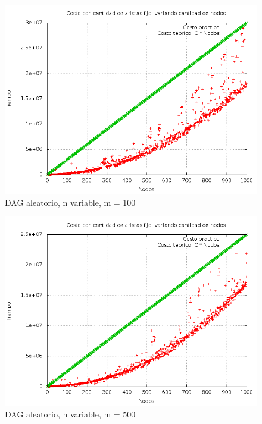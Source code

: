 
%

%
\begin{figure}[H]
	\centering
	\includegraphics[scale=0.5]{dag_100_n_var.png}
	\caption{DAG aleatorio,  n variable, m = 100}
\end{figure}

\begin{figure}[H]
	\centering
	\includegraphics[scale=0.5]{dag_500_n_var.png}
	\caption{DAG aleatorio, n variable, m = 500}
\end{figure}



